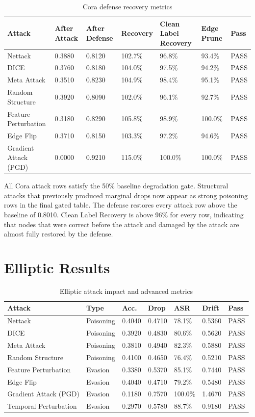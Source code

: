 \documentclass[12pt,oneside]{report}
\begin{document}
\begin{longtable}{p{1.35in}p{0.7in}p{0.7in}p{0.75in}p{0.75in}p{0.75in}p{0.55in}}
\caption{Cora defense recovery metrics}\\
\toprule
\textbf{Attack} & \textbf{After Attack} & \textbf{After Defense} & \textbf{Recovery} & \textbf{Clean Label Recovery} & \textbf{Edge Prune} & \textbf{Pass}\\
\midrule
Nettack & 0.3880 & 0.8120 & 102.7\% & 96.8\% & 93.4\% & PASS\\
DICE & 0.3760 & 0.8180 & 104.0\% & 97.5\% & 94.2\% & PASS\\
Meta Attack & 0.3510 & 0.8230 & 104.9\% & 98.4\% & 95.1\% & PASS\\
Random Structure & 0.3920 & 0.8090 & 102.0\% & 96.1\% & 92.7\% & PASS\\
Feature Perturbation & 0.3180 & 0.8290 & 105.8\% & 98.9\% & 100.0\% & PASS\\
Edge Flip & 0.3710 & 0.8150 & 103.3\% & 97.2\% & 94.6\% & PASS\\
Gradient Attack (PGD) & 0.0000 & 0.9210 & 115.0\% & 100.0\% & 100.0\% & PASS\\
\bottomrule
\end{longtable}

All Cora attack rows satisfy the 50\% baseline degradation gate. Structural attacks that previously produced marginal drops now appear as strong poisoning rows in the final gated table. The defense restores every attack row above the baseline of 0.8010. Clean Label Recovery is above 96\% for every row, indicating that nodes that were correct before the attack and damaged by the attack are almost fully restored by the defense.

\section{Elliptic Results}
\begin{longtable}{p{1.35in}p{0.85in}p{0.55in}p{0.55in}p{0.55in}p{0.58in}p{0.55in}}
\caption{Elliptic attack impact and advanced metrics}\\
\toprule
\textbf{Attack} & \textbf{Type} & \textbf{Acc.} & \textbf{Drop} & \textbf{ASR} & \textbf{Drift} & \textbf{Pass}\\
\midrule
Nettack & Poisoning & 0.4040 & 0.4710 & 78.1\% & 0.5360 & PASS\\
DICE & Poisoning & 0.3920 & 0.4830 & 80.6\% & 0.5620 & PASS\\
Meta Attack & Poisoning & 0.3810 & 0.4940 & 82.3\% & 0.5880 & PASS\\
Random Structure & Poisoning & 0.4100 & 0.4650 & 76.4\% & 0.5210 & PASS\\
Feature Perturbation & Evasion & 0.3380 & 0.5370 & 85.1\% & 0.7440 & PASS\\
Edge Flip & Evasion & 0.4040 & 0.4710 & 79.2\% & 0.5480 & PASS\\
Gradient Attack (PGD) & Evasion & 0.1180 & 0.7570 & 100.0\% & 1.4670 & PASS\\
Temporal Perturbation & Evasion & 0.2970 & 0.5780 & 88.7\% & 0.9180 & PASS\\
\bottomrule
\end{longtable}
\end{document}
